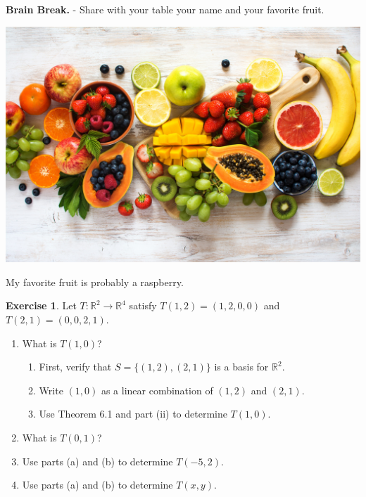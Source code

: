 \documentclass{beamer}
\newcommand{\R}{\mathbb{R}}
\newcommand{\fn}{\insertframenumber}
\theoremstyle{definition}
\newtheorem{exercise}{Exercise}
\begin{document}
\begin{frame}{\fn}
	\begin{block}{\textbf{Brain Break.} - }
		Share with your table your name and your favorite fruit.
		\begin{center}
			\includegraphics[height=.3\textheight]{images/fruit}
		\end{center}
	
		My favorite fruit is probably a raspberry.
	\end{block}
\end{frame}
\begin{frame}{\fn}
	\begin{exercise}
		Let $T:\R^2\to \R^4$ satisfy $T(1,2)=(1,2,0,0)$ and $T(2,1)=(0,0,2,1)$. 
		\begin{enumerate}[label=(\alph*)]
			\item  What is $T(1,0)$?
		\begin{enumerate}[label=\roman*.]
			\item First, verify that $S=\{(1,2),(2,1)\}$ is a basis for $\R^2$.
			\item Write $(1,0)$ as a linear combination of $(1,2)$ and $(2,1)$.
			\item Use Theorem 6.1 and part (ii) to determine $T(1,0)$.
		\end{enumerate}
			\item What is $T(0,1)$?
			\item Use parts (a) and (b) to determine $T(-5,2)$.
			\item Use parts (a) and (b) to determine $T(x,y)$.
		\end{enumerate}
	\end{exercise}
\end{frame}
\end{document}
